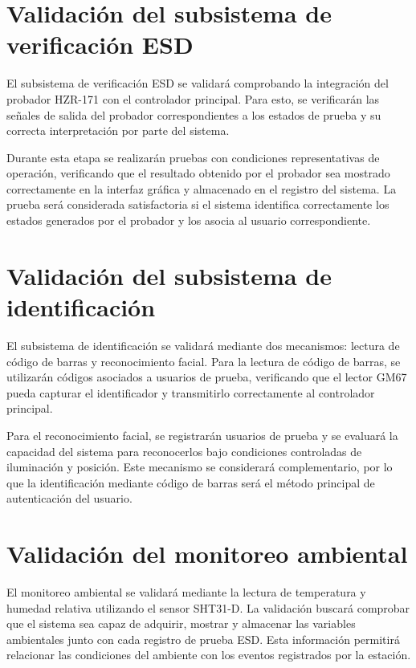 \section{Validación del subsistema de verificación ESD}

El subsistema de verificación ESD se validará comprobando la integración del probador
HZR-171 con el controlador principal. Para esto, se verificarán las señales de salida del
probador correspondientes a los estados de prueba y su correcta interpretación por parte
del sistema.

Durante esta etapa se realizarán pruebas con condiciones representativas de operación,
verificando que el resultado obtenido por el probador sea mostrado correctamente en la
interfaz gráfica y almacenado en el registro del sistema. La prueba será considerada
satisfactoria si el sistema identifica correctamente los estados generados por el probador
y los asocia al usuario correspondiente.

\section{Validación del subsistema de identificación}

El subsistema de identificación se validará mediante dos mecanismos: lectura de código de
barras y reconocimiento facial. Para la lectura de código de barras, se utilizarán códigos
asociados a usuarios de prueba, verificando que el lector GM67 pueda capturar el
identificador y transmitirlo correctamente al controlador principal.

Para el reconocimiento facial, se registrarán usuarios de prueba y se evaluará la capacidad
del sistema para reconocerlos bajo condiciones controladas de iluminación y posición. Este
mecanismo se considerará complementario, por lo que la identificación mediante código de
barras será el método principal de autenticación del usuario.

\section{Validación del monitoreo ambiental}

El monitoreo ambiental se validará mediante la lectura de temperatura y humedad relativa
utilizando el sensor SHT31-D. La validación buscará comprobar que el sistema 
sea capaz de adquirir, mostrar y almacenar
las variables ambientales junto con cada registro de prueba ESD. Esta información permitirá
relacionar las condiciones del ambiente con los eventos registrados por la estación.

